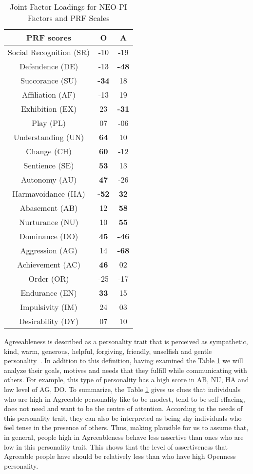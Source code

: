 \begin{table} [h]
\caption{Joint Factor Loadings for NEO-PI Factors and PRF Scales}
\centering
\begin{tabular}{c c c} 
\\
 \hline \hline
PRF	scores				& \textbf{O} 	&\textbf{A}	\\ [0.5ex] 
 \hline
 Social Recognition (SR)		& -10 		& -19		\\ 
 Defendence (DE)			& -13		& \textbf{-48}	\\
 Succorance (SU)			& \textbf{-34}	& 18			\\
 Affiliation (AF)				& -13  		& 19			\\
 Exhibition (EX)				& 23			& \textbf{-31}	\\
 Play (PL)					& 07			& -06		\\
 Understanding (UN)			& \textbf{64}	& 10			\\
 Change (CH)				& \textbf{60}	& -12		\\
 Sentience (SE)				& \textbf{53}	& 13			\\
 Autonomy (AU)			& \textbf{47}	& -26		\\
 Harmavoidance (HA)		& \textbf{-52}	& \textbf{32}	\\
 Abasement (AB)			& 12			& \textbf{58}	\\
 Nurturance (NU)			& 10			& \textbf{55}	\\
 Dominance (DO)			& \textbf{45}	& \textbf{-46}	\\
 Aggression (AG)			& 14			& \textbf{-68}	\\
 Achievement (AC)			& \textbf{46}	& 02			\\
 Order (OR)				& -25		& -17		\\
 Endurance (EN)			& \textbf{33}	& 15			\\
 Impulsivity (IM)				& 24			& 03			\\
 Desirability (DY)			& 07			& 10			\\ [1ex] 
 \hline \hline		
 \end{tabular}
 \label{table:2}
 \end{table}
\par Agreeableness is described as a personality trait that is perceived as sympathetic, kind, warm, generous, helpful, forgiving, friendly, unselfish and gentle personality~\cite{matthews2003personality}.
In addition to this definition, having examined the Table \ref{table:2} we will analyze their goals, motives and needs that they fulfill while communicating with others. 
For example, this type of personality has a high score in AB, NU, HA and low level of AG, DO. To summarize, the Table \ref{table:2} gives us clues that individuals who are high in Agreeable personality like to be modest, tend to be self-effacing, does not need and want to be the centre of attention. According to the needs of this personality trait, they can also be interpreted as being shy individuals who feel tense in the presence of others. Thus, making plausible for us to assume that, in general, people high in Agreeableness behave less assertive than ones who are low in this personality trait. This shows that the level of assertiveness that Agreeable people have should be relatively less than who have high Openness personality.
